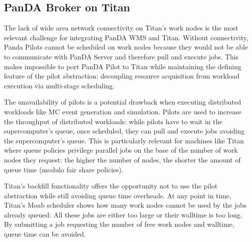 

\subsection{PanDA Broker on Titan}
\label{ssec:panda_titan}

The lack of wide area network connectivity on Titan's work nodes is the most
relevant challenge for integrating PanDA WMS and Titan. Without connectivity,
Panda Pilots cannot be scheduled on work nodes because they would not be able to
communicate with PanDA Server and therefore pull and execute jobs. This makes
impossible to port PanDA Pilot to Titan while maintaining the defining feature
of the pilot abstraction: decoupling resource acquisition from workload
execution via multi-stage scheduling.

The unavailability of pilots is a potential drawback when executing distributed
workloads like MC event generation and simulation. Pilots are used to increase
the throughput of distributed workloads: while pilots have to wait in the
supercomputer's queue, once scheduled, they can pull and execute jobs avoiding
the supercomputer's queue. This is particularly relevant for machines like Titan
where queue policies privilege parallel jobs on the base of the number of work
nodes they request: the higher the number of nodes, the shorter the amount of
queue time (modulo fair share policies).


Titan's backfill functionality offers the opportunity not to use the pilot
abstraction while still avoiding queue time overheads. At any point in time,
Titan's Moab scheduler shows how many work nodes cannot be used by the jobs
already queued: All these jobs are either too large or their walltime is too
long. By submitting a job requesting the number of free work nodes and walltime,
queue time can be avoided.

